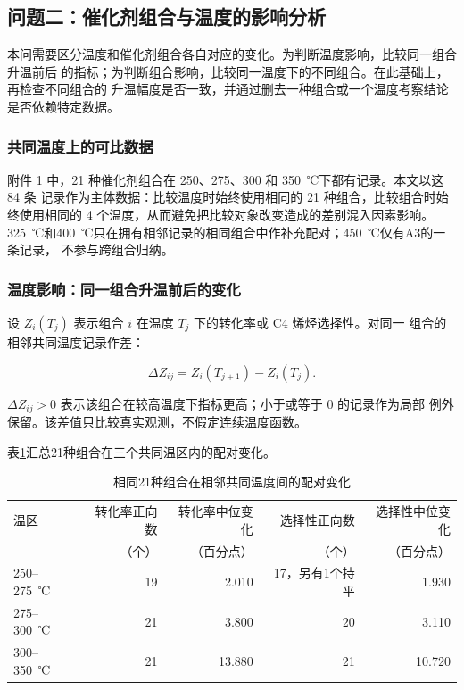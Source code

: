 \subsection{问题二：催化剂组合与温度的影响分析}

本问需要区分温度和催化剂组合各自对应的变化。为判断温度影响，比较同一组合升温前后
的指标；为判断组合影响，比较同一温度下的不同组合。在此基础上，再检查不同组合的
升温幅度是否一致，并通过删去一种组合或一个温度考察结论是否依赖特定数据。

\subsubsection{共同温度上的可比数据}

附件 1 中，21 种催化剂组合在 250、275、300 和 350~℃下都有记录。本文以这 84 条
记录作为主体数据：比较温度时始终使用相同的 21 种组合，比较组合时始终使用相同的
4 个温度，从而避免把比较对象改变造成的差别混入因素影响。
325~℃和400~℃只在拥有相邻记录的相同组合中作补充配对；450~℃仅有A3的一条记录，
不参与跨组合归纳。

\subsubsection{温度影响：同一组合升温前后的变化}

设 \(Z_i(T_j)\) 表示组合 \(i\) 在温度 \(T_j\) 下的转化率或 C4 烯烃选择性。对同一
组合的相邻共同温度记录作差：

\begin{equation}
\Delta Z_{ij}=Z_i(T_{j+1})-Z_i(T_j).
\tag{15}
\label{eq:q2-paired-change}
\end{equation}

\(\Delta Z_{ij}>0\) 表示该组合在较高温度下指标更高；小于或等于 0 的记录作为局部
例外保留。该差值只比较真实观测，不假定连续温度函数。

表\ref{tab:q2-paired-change}汇总21种组合在三个共同温区内的配对变化。
\begin{table}[H]
\centering
\caption{相同21种组合在相邻共同温度间的配对变化}
\label{tab:q2-paired-change}
\begin{tabular}{lrrrr}
\toprule
温区 & 转化率正向数 & 转化率中位变化 & 选择性正向数 & 选择性中位变化 \\
 & （个） & （百分点） & （个） & （百分点） \\
\midrule
250--275~℃ & 19 & 2.010 & 17，另有1个持平 & 1.930 \\
275--300~℃ & 21 & 3.800 & 20 & 3.110 \\
300--350~℃ & 21 & 13.880 & 21 & 10.720 \\
\bottomrule
\end{tabular}
\end{table}

